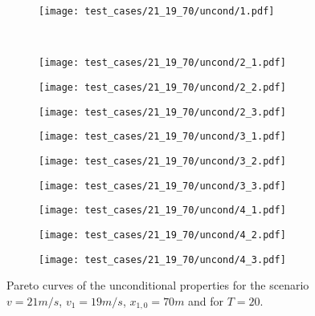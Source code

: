 
\begin{figure}[H]
\centering
\begin{subfigure}{0.32\textwidth}
  \centering
  \texttt{[image: test\_cases/21\_19\_70/uncond/1.pdf]}
\end{subfigure}\\
\begin{subfigure}{0.32\textwidth}
  \centering
  \texttt{[image: test\_cases/21\_19\_70/uncond/2\_1.pdf]}
\end{subfigure} 
\begin{subfigure}{0.32\textwidth}
  \centering
  \texttt{[image: test\_cases/21\_19\_70/uncond/2\_2.pdf]}
\end{subfigure}
\begin{subfigure}{0.32\textwidth}
  \centering
  \texttt{[image: test\_cases/21\_19\_70/uncond/2\_3.pdf]}
\end{subfigure}
\begin{subfigure}{0.32\textwidth}
  \centering
  \texttt{[image: test\_cases/21\_19\_70/uncond/3\_1.pdf]}
\end{subfigure}
\begin{subfigure}{0.32\textwidth}
  \centering
  \texttt{[image: test\_cases/21\_19\_70/uncond/3\_2.pdf]}
\end{subfigure}
\begin{subfigure}{0.32\textwidth}
  \centering
  \texttt{[image: test\_cases/21\_19\_70/uncond/3\_3.pdf]}
\end{subfigure}
\begin{subfigure}{0.32\textwidth}
  \centering
  \texttt{[image: test\_cases/21\_19\_70/uncond/4\_1.pdf]}
\end{subfigure} 
\begin{subfigure}{0.32\textwidth}
  \centering
  \texttt{[image: test\_cases/21\_19\_70/uncond/4\_2.pdf]}
\end{subfigure}
\begin{subfigure}{0.32\textwidth}
  \centering
  \texttt{[image: test\_cases/21\_19\_70/uncond/4\_3.pdf]}
\end{subfigure}
\caption{Pareto curves of the unconditional properties for the scenario $v = 21m/s$, $v_1 = 19m/s$, $x_{1,0} = 70m$ and for $T = 20$.}
\label{fig:test_case_1_uncond}
\end{figure}

